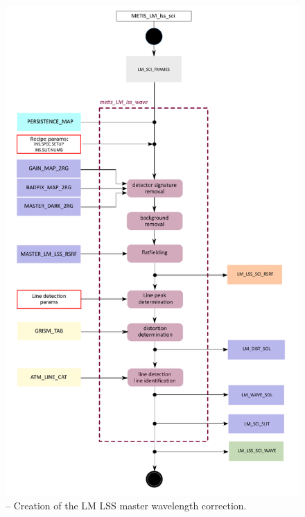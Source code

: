 \begin{figure}[ht]
  \centering
  \includegraphics[width=0.5\textheight]{figures/metis_lm_lss_wave_v0.64.pdf}
  \caption[Recipe: ]{ --
    Creation of the LM LSS master wavelength correction.}
  \label{Fig:rec_lm_lss_wave}
\end{figure}
\clearpage

